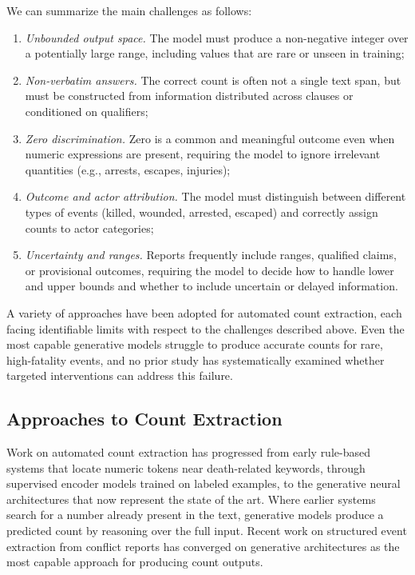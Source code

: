 \documentclass[
  11pt,
]{article}
\providecommand{\tightlist}{%
  \setlength{\itemsep}{0pt}\setlength{\parskip}{0pt}}
\begin{document}
We can summarize the main challenges as follows:

\begin{enumerate}
\def\labelenumi{\arabic{enumi}.}
\tightlist
\item
  \emph{Unbounded output space.} The model must produce a non-negative
  integer over a potentially large range, including values that are rare
  or unseen in training;
\item
  \emph{Non-verbatim answers.} The correct count is often not a single
  text span, but must be constructed from information distributed across
  clauses or conditioned on qualifiers;
\item
  \emph{Zero discrimination.} Zero is a common and meaningful outcome
  even when numeric expressions are present, requiring the model to
  ignore irrelevant quantities (e.g., arrests, escapes, injuries);
\item
  \emph{Outcome and actor attribution.} The model must distinguish
  between different types of events (killed, wounded, arrested, escaped)
  and correctly assign counts to actor categories;
\item
  \emph{Uncertainty and ranges.} Reports frequently include ranges,
  qualified claims, or provisional outcomes, requiring the model to
  decide how to handle lower and upper bounds and whether to include
  uncertain or delayed information.
\end{enumerate}

A variety of approaches have been adopted for automated count
extraction, each facing identifiable limits with respect to the
challenges described above. Even the most capable generative models
struggle to produce accurate counts for rare, high-fatality events, and
no prior study has systematically examined whether targeted
interventions can address this failure.

\subsection{Approaches to Count
Extraction}\label{approaches-to-count-extraction}

Work on automated count extraction has progressed from early rule-based
systems that locate numeric tokens near death-related keywords, through
supervised encoder models trained on labeled examples, to the generative
neural architectures that now represent the state of the art. Where
earlier systems search for a number already present in the text,
generative models produce a predicted count by reasoning over the full
input. Recent work on structured event extraction from conflict reports
has converged on generative architectures as the most capable approach
for producing count outputs.
\end{document}
